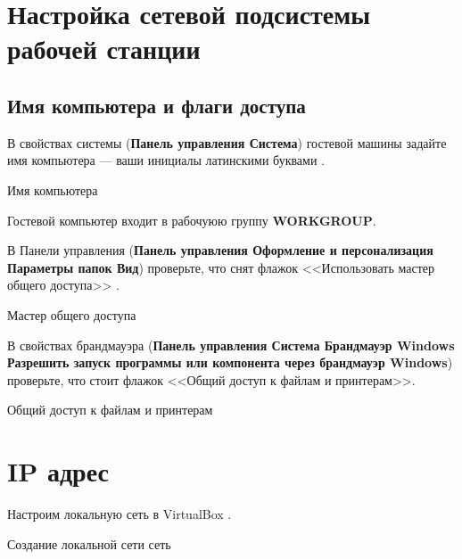 \section{Настройка сетевой подсистемы рабочей станции}

\subsection{Имя компьютера и флаги доступа}

В свойствах системы (\textbf{Панель управления \rarrow Система})
гостевой машины задайте имя компьютера --- ваши инициалы латинскими буквами
.

\begin{image}
	\caption{Имя компьютера}
	\label{fig:name}
\end{image}

Гостевой компьютер входит в рабочуюю группу \textbf{WORKGROUP}.

В Панели управления (\textbf{Панель управления
\rarrow Оформление и персонализация \rarrow Параметры папок \rarrow Вид})
проверьте, что снят флажок <<Использовать мастер общего доступа>>
.

\begin{image}
	\caption{Мастер общего доступа}
	\label{fig:flag:master:share}
\end{image}

В свойствах брандмауэра (\textbf{Панель управления \rarrow Система
\rarrow Брандмауэр Windows
\rarrow Разрешить запуск программы или компонента через брандмауэр Windows})
проверьте, что стоит флажок <<Общий доступ к файлам и принтерам>>.

\begin{image}
	\caption{Общий доступ к файлам и принтерам}
	\label{fig:flag:share:file}
\end{image}

\section{IP адрес}

Настроим локальную сеть в VirtualBox .

\begin{image}
	\caption{Создание локальной сети сеть}
	\label{fig:host:only:net}
\end{image}

